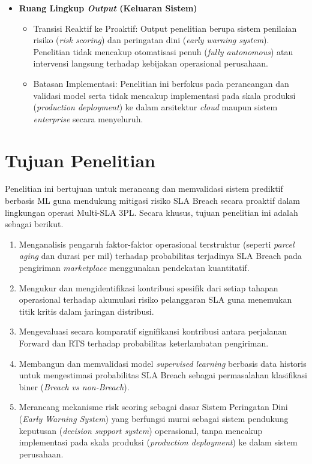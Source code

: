 \begin{itemize}
\begin{itemize}
        \end{itemize}
    \item \textbf{Ruang Lingkup \textit{Output} (Keluaran Sistem)}
        \begin{itemize}
            \item Transisi Reaktif ke Proaktif: Output penelitian berupa sistem penilaian risiko (\textit{risk scoring}) dan peringatan dini (\textit{early warning system}). Penelitian tidak mencakup otomatisasi penuh (\textit{fully autonomous}) atau intervensi langsung terhadap kebijakan operasional perusahaan.
            \item Batasan Implementasi: Penelitian ini berfokus pada perancangan dan validasi model serta tidak mencakup implementasi pada skala produksi (\textit{production deployment}) ke dalam arsitektur \textit{cloud} maupun sistem \textit{enterprise} secara menyeluruh.
        \end{itemize}
\end{itemize}
\section{Tujuan Penelitian}
\label{sec:tujuanPenelitian}

Penelitian ini bertujuan untuk merancang dan memvalidasi sistem prediktif berbasis ML guna mendukung mitigasi risiko SLA Breach secara proaktif dalam lingkungan operasi Multi-SLA 3PL. Secara khusus, tujuan penelitian ini adalah sebagai berikut.

\begin{enumerate}
    \item Menganalisis pengaruh faktor-faktor operasional terstruktur (seperti \textit{parcel aging} dan durasi per mil) terhadap probabilitas terjadinya SLA Breach pada pengiriman \textit{marketplace} menggunakan pendekatan kuantitatif.
    \item Mengukur dan mengidentifikasi kontribusi spesifik dari setiap tahapan operasional terhadap akumulasi risiko pelanggaran SLA guna menemukan titik kritis dalam jaringan distribusi.
    \item Mengevaluasi secara komparatif signifikansi kontribusi antara perjalanan Forward dan RTS terhadap probabilitas keterlambatan pengiriman.
    \item Membangun dan memvalidasi model \textit{supervised learning} berbasis data historis untuk mengestimasi probabilitas SLA Breach sebagai permasalahan klasifikasi biner (\textit{Breach vs non-Breach}).
    \item Merancang mekanisme risk scoring sebagai dasar Sistem Peringatan Dini (\textit{Early Warning System}) yang berfungsi murni sebagai sistem pendukung keputusan (\textit{decision support system}) operasional, tanpa mencakup implementasi pada skala produksi (\textit{production deployment}) ke dalam sistem perusahaan.
\end{enumerate}


